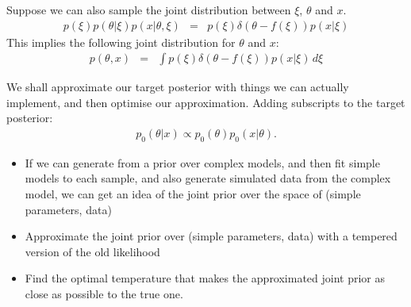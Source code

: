 \documentclass[letterpaper, 11pt]{article}
\begin{document}
Suppose we can also sample the joint distribution between $\xi$, $\theta$
and $x$.
\begin{eqnarray}
p(\xi)p(\theta|\xi)p(x|\theta, \xi) &=& p(\xi)\delta\left(
\theta - f(\xi)\right)p(x|\xi)
\end{eqnarray}
This implies the following joint distribution for $\theta$ and $x$:
\begin{eqnarray}
p(\theta, x) &=& \int p(\xi)\delta\left(
\theta - f(\xi)\right)p(x|\xi) \, d\xi
\end{eqnarray}


We shall approximate our target posterior with things we can actually
implement, and then optimise our approximation. Adding subscripts to the target
posterior:
\begin{eqnarray}
p_0(\theta|x) \propto p_0(\theta)p_0(x|\theta).
\end{eqnarray}








\begin{itemize}
\item If we can generate from a prior over complex models, and then fit simple models to each sample, and also generate simulated data from the complex model, we can get an idea of the joint prior over the space of (simple parameters, data)\\
\item Approximate the joint prior over (simple parameters, data) with a tempered version of the old likelihood \\
\item Find the optimal temperature that makes the approximated joint prior as close as possible to the true one.
\end{itemize}
\end{document}
